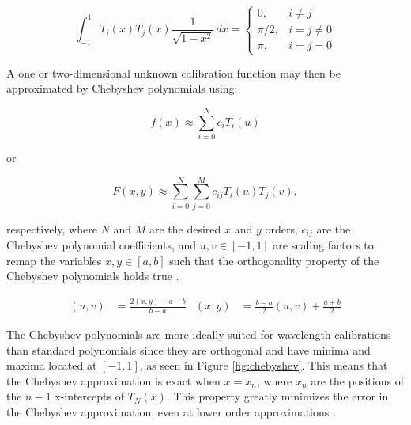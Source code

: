 \begin{equation}
    \int_{-1}^{1} T_{i}(x) T_{j}(x) \frac{1}{\sqrt{1-x^{2}}} \,dx =
    \begin{cases}
        0,       & i \neq j\\
        \pi / 2, & i = j \neq 0\\
        \pi,     & i = j = 0
    \end{cases}
    \label{eq:chebyorth}
\end{equation}

A one or two-dimensional unknown calibration function may then be approximated by Chebyshev polynomials using:

\begin{equation}
    f(x) \approx \sum_{i = 0}^{N}  c_{i} T_{i}(u)
    \label{eq:chebyshev}
\end{equation}

\noindent or

\begin{equation}
    F(x, y) \approx \sum_{i = 0}^{N} \sum_{j = 0}^{M} c_{ij} T_{i}(u) T_{j}(v),
    \label{eq:chebyshev2D}
\end{equation}

\noindent respectively, where $N$ and $M$ are the desired $x$ and $y$ orders, $c_{ij}$ are the Chebyshev polynomial coefficients, and $u, v \in [-1, 1]$ are scaling factors to remap the variables $x, y \in [a, b]$ such that the orthogonality property of the Chebyshev polynomials holds true \citep{chebysurf, cheby2d}.

\begin{align}
    (u, v) &= \frac{2 (x, y) - a - b}{b - a} & (x, y) &= \frac{b - a}{2} (u, v) + \frac{a+b}{2}
    \label{eq:XtoUV}
\end{align}





The Chebyshev polynomials are more ideally suited for wavelength calibrations than standard polynomials since they are orthogonal and have minima and maxima located at $[-1, 1]$, as seen in Figure \ref{fig:chebyshev}. This means that the Chebyshev approximation is exact when $x = x_{n}$, where $x_{n}$ are the positions of the $n - 1$ x-intercepts of $T_{N}(x)$. This property greatly minimizes the error in the Chebyshev approximation, even at lower order approximations \citep{cheby}.

